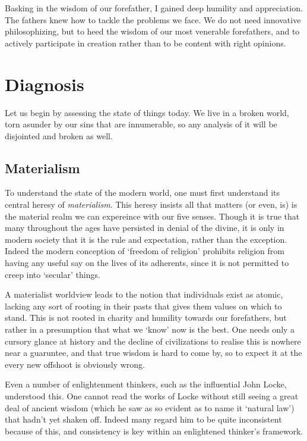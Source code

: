 \documentclass[letterpaper]{article}
\begin{document}
Basking in the wisdom of our forefather, I gained deep humility and appreciation. The fathers knew how to tackle the problems we face. We do not need innovative philosophizing, but to heed the wisdom of our most venerable forefathers, and to actively participate in creation rather than to be content with right opinions.

\section{Diagnosis}

Let us begin by assessing the state of things today. We live in a broken world, torn asunder by our sins that are innumerable, so any analysis of it will be disjointed and broken as well.

\subsection{Materialism}

To understand the state of the modern world, one must first understand its central heresy of \textit{materialism}. This heresy insists all that matters (or even, is) is the material realm we can expereince with our five senses. Though it is true that many throughout the ages have persisted in denial of the divine, it is only in modern society that it is the rule and expectation, rather than the exception. Indeed the modern conception of `freedom of religion' prohibits religion from having any useful say on the lives of its adherents, since it is not permitted to creep into `secular' things.

A materialist worldview leads to the notion that individuals exist as atomic, lacking any sort of rooting in their pasts that gives them values on which to stand. This is not rooted in charity and humility towards our forefathers, but rather in a presumption that what we `know' now is the best. One needs only a cursory glance at history and the decline of civilizations to realise this is nowhere near a guaruntee, and that true wisdom is hard to come by, so to expect it at the every new offshoot is obviously wrong.

Even a number of enlightenment thinkers, such as the influential John Locke, understood this. One cannot read the works of Locke without still seeing a great deal of ancient wisdom (which he saw as so evident as to name it `natural law') that hadn't yet shaken off. Indeed many regard him to be quite inconsistent because of this, and consistency is key within an enlightened thinker's framework.
\end{document}
